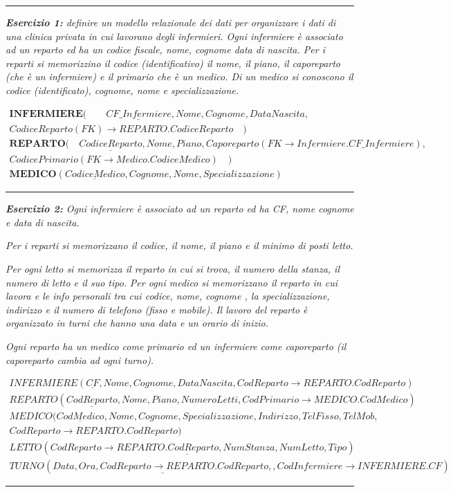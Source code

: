 \documentclass{article}
\begin{document}
 \par\rule{\textwidth}{0.5pt} 
 
\textit{ \textbf{Esercizio 1:} definire un modello relazionale dei dati per organizzare i dati di una clinica privata in cui lavorano degli infermieri. Ogni infermiere è associato ad un reparto ed ha un codice fiscale, nome, cognome data di nascita. Per i reparti si memorizzino il codice (identificativo)  il nome, il piano, il caporeparto (che è un infermiere) e il primario che è un medico. Di un medico si conoscono il codice (identificato), cognome, nome e specializzazione.}

\begin{align*}
    \textbf{INFERMIERE}(\quad\quad \underline{CF\_Infermiere}, Nome, Cognome, DataNascita,\quad \\ CodiceReparto(FK)\to REPARTO.CodiceReparto  \quad)\\
    \textbf{REPARTO}( \quad \underline{CodiceReparto}, Nome, Piano, Caporeparto (FK \to Infermiere.CF\_Infermiere),\quad \\CodicePrimario(FK \to Medico.CodiceMedico) \quad  ) \\
    \textbf{MEDICO}(\underline{CodiceMedico}, Cognome, Nome, Specializzazione)
\end{align*}

 \par\rule{\textwidth}{0.5pt} 

\textit{\textbf{Esercizio 2:} Ogni infermiere è associato ad un reparto ed ha CF, nome cognome e data di nascita.}
 
\textit{Per i reparti si memorizzano il codice, il nome, il piano e il minimo di posti letto.}
 
\textit{Per ogni letto si memorizza il reparto in cui si trova, il numero della stanza, il numero di letto e il suo tipo.
} 
\textit{Per ogni medico si memorizzano il reparto in cui lavora e le info personali tra cui codice, nome, cognome , la specializzazione, indirizzo e il numero di telefono (fisso e mobile).
} 
\textit{Il lavoro del reparto è organizzato in turni che hanno una data e un orario di inizio.}

\textit{Ogni reparto ha un medico come primario ed un infermiere come caporeparto (il caporeparto cambia ad ogni turno).}

\begin{align*}
    INFERMIERE(\underline{CF},Nome, Cognome, DataNascita, CodReparto \to REPARTO.CodReparto) \\
    REPARTO(\underline{CodReparto}, Nome, Piano, NumeroLetti, CodPrimario \to MEDICO.CodMedico) \\
    MEDICO (\underline{CodMedico}, Nome, Cognome, Specializzazione, Indirizzo, TelFisso, TelMob, \quad \\ CodReparto \to REPARTO.CodReparto)
    \\ LETTO ( \underline{CodReparto \to REPARTO.CodReparto, NumStanza, NumLetto}, Tipo)
    \\ TURNO (\underline{Data, Ora, CodReparto \to REPARTO.CodReparto, }, CodInfermiere \to INFERMIERE.CF)
\end{align*}
\par\rule{\textwidth}{0.5pt} 
\end{document}
